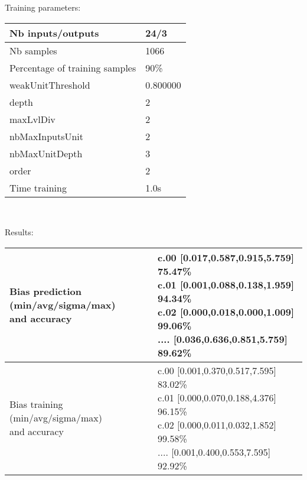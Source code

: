 Training parameters:\\
\begin{center}
\begin{tabular}{|l|l|}
\hline
Nb inputs/outputs&24/3\\
\hline
Nb samples&1066\\
\hline
Percentage of training samples&90\%\\
\hline
weakUnitThreshold&0.800000\\
\hline
depth&2\\
\hline
maxLvlDiv&2\\
\hline
nbMaxInputsUnit&2\\
\hline
nbMaxUnitDepth&3\\
\hline
order&2\\
\hline
Time training&1.0s\\
\hline
\end{tabular}\\
\end{center}\newline
Results:
\begin{center}
\begin{tabular}{|l|l|}
\hline
\makecell{Bias prediction (min/avg/sigma/max)\\and accuracy}&\makecell{c.00 [0.017,0.587,0.915,5.759] 75.47\%\\
c.01 [0.001,0.088,0.138,1.959] 94.34\%\\
c.02 [0.000,0.018,0.000,1.009] 99.06\%\\
.... [0.036,0.636,0.851,5.759] 89.62\%\\
}\\

\hline
\makecell{Bias training (min/avg/sigma/max)\\and accuracy}&\makecell{c.00 [0.001,0.370,0.517,7.595] 83.02\%\\
c.01 [0.000,0.070,0.188,4.376] 96.15\%\\
c.02 [0.000,0.011,0.032,1.852] 99.58\%\\
.... [0.001,0.400,0.553,7.595] 92.92\%\\
}\\
\hline
\end{tabular}\
\end{center}
